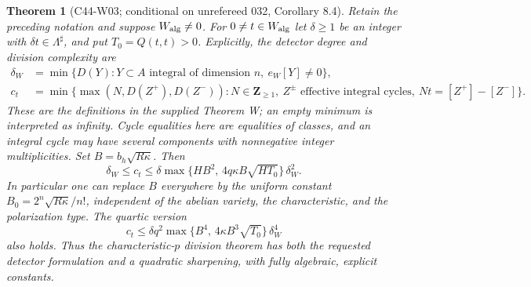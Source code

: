 \documentclass[11pt]{article}
\newtheorem{theorem}{Theorem}[section]
\theoremstyle{remark}\newtheorem{remark}[theorem]{Remark}
\begin{document}
\begin{theorem}[C44-W03; conditional on unrefereed 032, Corollary 8.4]
Retain the preceding notation and suppose $W_{\rm alg}\ne0$.
For $0\ne t\in W_{\rm alg}$ let $\delta\geq1$ be an integer with
$\delta t\in\Lambda^\sharp$, and put $T_0=Q(t,t)>0$.
Explicitly, the detector degree and division complexity are
\begin{align*}
 \delta_W&=\min\{D(Y):Y\subset A\text{ integral of dimension }n,
                                      \ e_W[Y]\ne0\},\\
 c_t&=\min\{\max(N,D(Z^+),D(Z^-)):
       N\in\mathbf Z_{\geq1},\ Z^\pm\text{ effective integral cycles},
                              \ Nt=[Z^+]-[Z^-]\}.
\end{align*}
These are the definitions in the supplied Theorem W; an empty minimum
is interpreted as infinity.  Cycle equalities here are equalities of
classes, and an integral cycle may have several components with
nonnegative integer multiplicities.
Set $B=b_h\sqrt{R\kappa}$.  Then
\begin{equation}\label{c44:weil-quadratic}
 \delta_W\leq c_t\leq
 \delta\max\{HB^2,\,4q\kappa B\sqrt{HT_0}\}\,\delta_W^2.
\end{equation}
In particular one can replace $B$ everywhere by the uniform constant
$B_0=2^n\sqrt{R\kappa}/n!$, independent of the abelian variety, the
characteristic, and the polarization type.  The quartic version
\begin{equation}\label{c44:weil-quartic}
 c_t\leq\delta q^2\max\{B^4,\,4\kappa B^3\sqrt{T_0}\}\,\delta_W^4
\end{equation}
also holds.  Thus the characteristic-$p$ division theorem has both
the requested detector formulation and a quadratic sharpening,
with fully algebraic, explicit constants.
\end{theorem}
\end{document}
